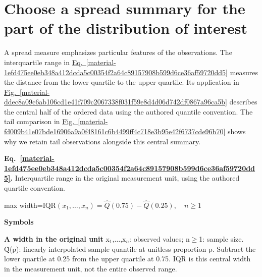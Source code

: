 \documentclass[11pt,a4paper]{article}
\begin{document}
\medskip

\clearpage
\section{Choose a spread summary for the part of the distribution of interest}
A spread measure emphasizes particular features of the observations. The interquartile range in \hyperref[material-1efd475ee0eb348a412dcda5c00354f2a64c89157908b599d6ce36af59720dd5]{Eq.~\ref*{material-1efd475ee0eb348a412dcda5c00354f2a64c89157908b599d6ce36af59720dd5}} measures the distance from the lower quartile to the upper quartile. Its application in \hyperref[material-ddec8a09c6ab106cd1e41f709c2067338f031f59e8d4d06d742df0867a96ca5b]{Fig.~\ref*{material-ddec8a09c6ab106cd1e41f709c2067338f031f59e8d4d06d742df0867a96ca5b}} describes the central half of the ordered data using the authored quantile convention. The tail comparison in \hyperref[material-fd009b41e07bde16906a9a0f48161c6b4499ff4c718e3b95e42f6737cde96b70]{Fig.~\ref*{material-fd009b41e07bde16906a9a0f48161c6b4499ff4c718e3b95e42f6737cde96b70}} shows why we retain tail observations alongside this central summary.


\par\medskip
\noindent\begin{minipage}{\linewidth}
\label{material-1efd475ee0eb348a412dcda5c00354f2a64c89157908b599d6ce36af59720dd5}
\noindent\textbf{Eq.~\ref*{material-1efd475ee0eb348a412dcda5c00354f2a64c89157908b599d6ce36af59720dd5}.} Interquartile range in the original measurement unit, using the authored quartile convention.\par\nopagebreak
\begin{center}\begin{adjustbox}{max width=\linewidth}$\displaystyle \mathrm{IQR}(x_1,\ldots,x_n)=\widehat Q(0.75)-\widehat Q(0.25),\quad n\ge1$\end{adjustbox}\end{center}

\par\noindent\textbf{Symbols}

\par\noindent\textbf{A width in the original unit} x\ensuremath{{}_1},\ensuremath{\ldots},x\ensuremath{{}_n}: observed values; n\ensuremath{\ge}1: sample size. Q̂(p): linearly interpolated sample quantile at unitless proportion p. Subtract the lower quartile at 0.25 from the upper quartile at 0.75. IQR is this central width in the measurement unit, not the entire observed range.

\end{minipage}\par
\medskip
\end{document}

